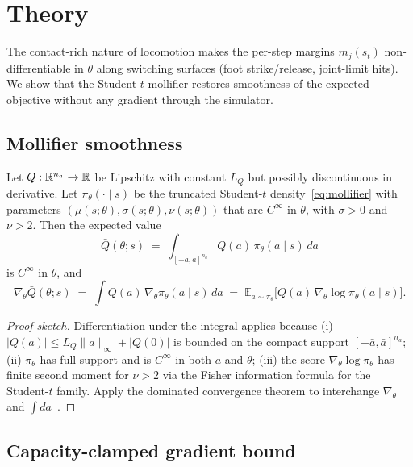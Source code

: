 \section{Theory}
\label{sec:theory}

The contact-rich nature of locomotion makes the per-step margins
$m_j(s_t)$ non-differentiable in $\theta$ along switching surfaces
(foot strike/release, joint-limit hits). We show that the Student-$t$
mollifier restores smoothness of the expected objective without any
gradient through the simulator.

\subsection{Mollifier smoothness}
\label{sec:smoothness}

\begin{lemma}
\label{lem:smoothness}
Let $Q : \mathbb{R}^{n_a} \to \mathbb{R}$ be Lipschitz with constant $L_Q$ but possibly
discontinuous in derivative. Let $\pi_\theta(\cdot \mid s)$ be the
truncated Student-$t$ density~\eqref{eq:mollifier} with parameters
$(\mu(s; \theta), \sigma(s; \theta), \nu(s; \theta))$ that are
$C^\infty$ in $\theta$, with $\sigma > 0$ and $\nu > 2$. Then the
expected value
\[
  \bar Q(\theta; s) \;=\;
  \int_{[-\bar a, \bar a]^{n_a}} Q(a)\,
  \pi_\theta(a \mid s)\, da
\]
is $C^\infty$ in $\theta$, and
\[
  \nabla_\theta \bar Q(\theta; s) \;=\;
  \int Q(a)\, \nabla_\theta \pi_\theta(a \mid s)\, da
  \;=\;
  \mathbb{E}_{a \sim \pi_\theta}\!\bigl[
    Q(a)\, \nabla_\theta \log \pi_\theta(a \mid s)
  \bigr].
\]
\end{lemma}

\begin{proof}[Proof sketch]
Differentiation under the integral applies because (i) $|Q(a)| \le L_Q
\|a\|_\infty + |Q(0)|$ is bounded on the compact support
$[-\bar a, \bar a]^{n_a}$; (ii) $\pi_\theta$ has full support and is
$C^\infty$ in both $a$ and $\theta$; (iii) the score
$\nabla_\theta \log \pi_\theta$ has finite second moment for $\nu > 2$
via the Fisher information formula for the Student-$t$ family. Apply
the dominated convergence theorem to interchange $\nabla_\theta$ and
$\int da$~\cite{folland1999real}.
\end{proof}

\subsection{Capacity-clamped gradient bound}
\label{sec:gradbound}

